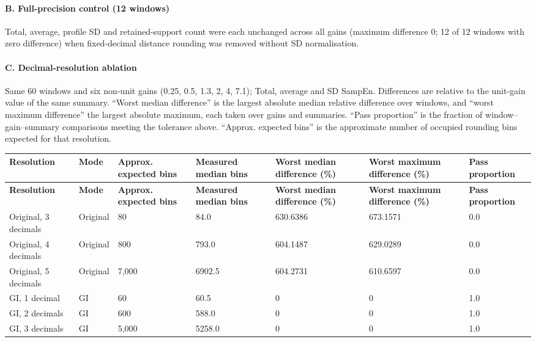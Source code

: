 \documentclass[10pt]{article}
\begin{document}
\paragraph{B. Full-precision control (12 windows)}
Total, average, profile SD and retained-support count were each unchanged across all gains (maximum difference 0; 12 of 12 windows with zero difference) when fixed-decimal distance rounding was removed without SD normalisation.
\paragraph{C. Decimal-resolution ablation}
Same 60 windows and six non-unit gains (0.25, 0.5, 1.3, 2, 4, 7.1); Total, average and SD SampEn. Differences are relative to the unit-gain value of the same summary. ``Worst median difference'' is the largest absolute median relative difference over windows, and ``worst maximum difference'' the largest absolute maximum, each taken over gains and summaries. ``Pass proportion'' is the fraction of window--gain--summary comparisons meeting the tolerance above. ``Approx. expected bins'' is the approximate number of occupied rounding bins expected for that resolution.
\begin{longtable}{p{2cm}p{1.5cm}p{2cm}p{2.5cm}p{3cm}p{3cm}p{2cm}}
\toprule
\textbf{Resolution} & \textbf{Mode} & \textbf{Approx. expected bins} & \textbf{Measured median bins} & \textbf{Worst median difference (\%)} & \textbf{Worst maximum difference (\%)} & \textbf{Pass proportion} \\
\midrule
\endfirsthead
\toprule
\textbf{Resolution} & \textbf{Mode} & \textbf{Approx. expected bins} & \textbf{Measured median bins} & \textbf{Worst median difference (\%)} & \textbf{Worst maximum difference (\%)} & \textbf{Pass proportion} \\
\midrule
\endhead
Original, 3 decimals & Original & 80 & 84.0 & 630.6386 & 673.1571 & 0.0 \\
Original, 4 decimals & Original & 800 & 793.0 & 604.1487 & 629.0289 & 0.0 \\
Original, 5 decimals & Original & 7,000 & 6902.5 & 604.2731 & 610.6597 & 0.0 \\
GI, 1 decimal & GI & 60 & 60.5 & 0 & 0 & 1.0 \\
GI, 2 decimals & GI & 600 & 588.0 & 0 & 0 & 1.0 \\
GI, 3 decimals & GI & 5,000 & 5258.0 & 0 & 0 & 1.0 \\
\bottomrule
\end{longtable}
\end{document}
